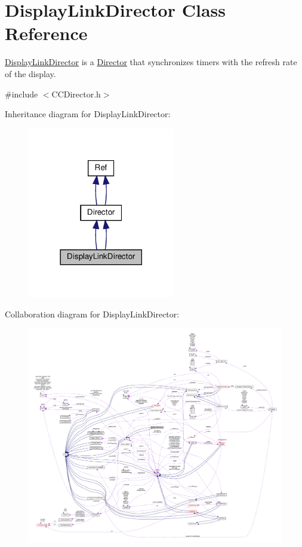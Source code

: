 \hypertarget{classDisplayLinkDirector}{}\section{Display\+Link\+Director Class Reference}
\label{classDisplayLinkDirector}


\hyperlink{classDisplayLinkDirector}{Display\+Link\+Director} is a \hyperlink{classDirector}{Director} that synchronizes timers with the refresh rate of the display.  




{\ttfamily \#include $<$C\+C\+Director.\+h$>$}



Inheritance diagram for Display\+Link\+Director\+:
\nopagebreak
\begin{figure}[H]
\begin{center}
\leavevmode
\includegraphics[width=182pt]{classDisplayLinkDirector__inherit__graph}
\end{center}
\end{figure}


Collaboration diagram for Display\+Link\+Director\+:
\nopagebreak
\begin{figure}[H]
\begin{center}
\leavevmode
\includegraphics[width=350pt]{classDisplayLinkDirector__coll__graph}
\end{center}
\end{figure}
